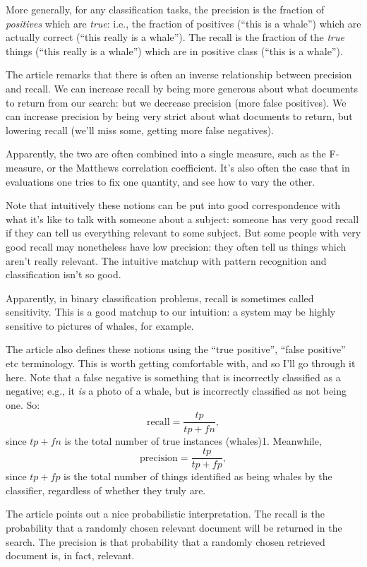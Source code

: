 More generally, for any classification tasks, the precision is the
fraction of \emph{positives} which are \emph{true}: i.e., the fraction
of positives (``this is a whale'') which are actually correct (``this
really is a whale'').  The recall is the fraction of the \emph{true}
things (``this really is a whale'') which are in positive class
(``this is a whale'').

The article remarks that there is often an inverse relationship
between precision and recall. We can increase recall by being more
generous about what documents to return from our search: but we
decrease precision (more false positives).  We can increase precision
by being very strict about what documents to return, but lowering
recall (we'll miss some, getting more false negatives).

Apparently, the two are often combined into a single measure, such as
the F-measure, or the Matthews correlation coefficient.  It's also
often the case that in evaluations one tries to fix one quantity, and
see how to vary the other.

Note that intuitively these notions can be put into good
correspondence with what it's like to talk with someone about a
subject: someone has very good recall if they can tell us everything
relevant to some subject.  But some people with very good recall may
nonetheless have low precision: they often tell us things which aren't
really relevant.  The intuitive matchup with pattern recognition and
classification isn't so good.

Apparently, in binary classification problems, recall is sometimes
called sensitivity.  This is a good matchup to our intuition: a system
may be highly sensitive to pictures of whales, for example.

The article also defines these notions using the ``true positive'',
``false positive'' etc terminology.  This is worth getting comfortable
with, and so I'll go through it here.  Note that a false negative is
something that is incorrectly classified as a negative; e.g., it
\emph{is} a photo of a whale, but is incorrectly classified as not
being one.  So:
$$
\mbox{recall} = \frac{tp}{tp+fn}, 
$$ 
since $tp+fn$ is the total number of true instances (whales)1.
Meanwhile,
$$
\mbox{precision} = \frac{tp}{tp+fp},
$$
since $tp+fp$ is the total number of things identified as being whales
by the classifier, regardless of whether they truly are.

The article points out a nice probabilistic interpretation.  The
recall is the probability that a randomly chosen relevant document
will be returned in the search.  The precision is that probability
that a randomly chosen retrieved document is, in fact, relevant.

